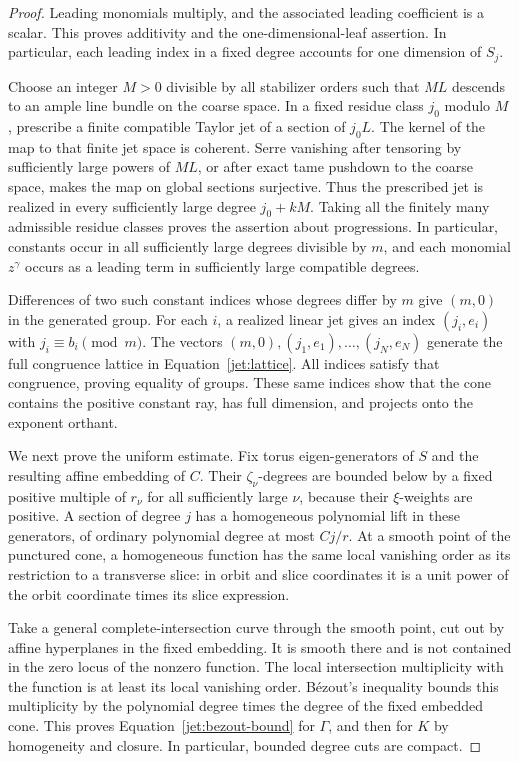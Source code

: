 \begin{proof}
Leading monomials multiply, and the associated leading coefficient is a
scalar. This proves additivity and the one-dimensional-leaf assertion.
In particular, each leading index in a fixed degree accounts for one
dimension of $S_j$.

Choose an integer $M>0$ divisible by all stabilizer orders such that
$ML$ descends to an ample line bundle on the coarse space. In a fixed
residue class $j_0$ modulo $M$, prescribe a finite compatible Taylor jet
of a section of $j_0L$. The kernel of the map to that finite jet space
is coherent. Serre vanishing after tensoring by sufficiently large
powers of $ML$, or after exact tame pushdown to the coarse space,
makes the map on global sections surjective. Thus the prescribed jet is
realized in every sufficiently large degree $j_0+kM$. Taking all the
finitely many admissible residue classes proves the assertion about
progressions. In particular, constants occur in all sufficiently large
degrees divisible by $m$, and each monomial $z^\gamma$ occurs as a
leading term in sufficiently large compatible degrees.

Differences of two such constant indices whose degrees differ by $m$
give $(m,0)$ in the generated group. For each $i$, a realized linear
jet gives an index $(j_i,e_i)$ with $j_i\equiv b_i\pmod m$.
The vectors $(m,0),(j_1,e_1),\ldots,(j_N,e_N)$ generate the full
congruence lattice in Equation~\eqref{jet:lattice}. All indices satisfy
that congruence, proving equality of groups. These same indices show
that the cone contains the positive constant ray, has full dimension,
and projects onto the exponent orthant.

We next prove the uniform estimate. Fix torus eigen-generators of $S$
and the resulting affine embedding of $C$. Their $\zeta_\nu$-degrees
are bounded below by a fixed positive multiple of $r_\nu$ for all
sufficiently large $\nu$, because their $\xi$-weights are positive.
A section of degree $j$ has a homogeneous polynomial lift in these
generators, of ordinary polynomial degree at most $Cj/r$. At a smooth
point of the punctured cone, a homogeneous function has the same local
vanishing order as its restriction to a transverse slice: in orbit and
slice coordinates it is a unit power of the orbit coordinate times its
slice expression.

Take a general complete-intersection curve through the smooth point,
cut out by affine hyperplanes in the fixed embedding. It is smooth
there and is not contained in the zero locus of the nonzero function.
The local intersection multiplicity with the function is at least its
local vanishing order. B\'ezout's inequality bounds this multiplicity
by the polynomial degree times the degree of the fixed embedded cone.
This proves Equation~\eqref{jet:bezout-bound} for $\Gamma$, and then for
$K$ by homogeneity and closure. In particular, bounded degree cuts are
compact.


\end{proof}
